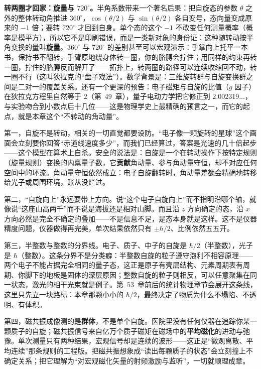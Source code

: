 \begin{challenge}
\textbf{转两圈才回家：旋量与 $720^\circ$。}半角系数带来一个著名后果：把自旋态的参数 $\theta$ 之外的整体转动角推进 $360^\circ$，$\cos(\theta/2)$ 与 $\sin(\theta/2)$ 各自变号，态向量变成原来的 $-1$ 倍；要转 $720^\circ$ 才回到自身。单个态的这个 $-1$ 不改变任何测量概率（概率是模平方），所以它不是印刷错误，而是一类新对象的身份证：这种随转动按半角变换的量叫\textbf{旋量}。$360^\circ$ 与 $720^\circ$ 的差别甚至可以宏观演示：手掌向上托平一本书，保持书不翻转，手臂原地绕身体转一圈，你的胳膊会拧住；用同样的约束再转一圈，拧住的胳膊反而解开了——拓扑上，转两圈的路径可以连续收缩回不动，转一圈不行（这叫狄拉克的“盘子戏法”）。数学背景是：三维旋转群与自旋变换群之间是二对一的覆盖关系。还有一个更深的预告：电子磁矩与自旋的比值（$g$ 因子）在狄拉克方程里自然等于 $2$（第~49~章），量子电动力学把它修正到 $2.002319\ldots$，与实验吻合到小数点后十几位——这是物理学史上最精确的预言之一，而它的起点，就是本章这个“不转动的角动量”。
\end{challenge}


第一，自旋不是转动，相关的一切直觉都要设防。“电子像一颗旋转的星球”这个画面会立刻要你回答“赤道线速度多少”，而我们已经算过，答案是光速的几十倍起步——这个模型在算术上自杀。安全的说法是：自旋是一个在转动操作下按特定规则（旋量规则）变换的内禀量子数，它\textbf{贡献}角动量、参与角动量守恒，却不对应任何空间中的环流。角动量守恒依然成立：电子自旋翻转时，角动量差额会精确地转移给光子或周围环境，账从没烂过。

第二，“自旋向上”永远要带上方向。说“这个电子自旋向上”而不指明沿哪个轴，就像说“这座山高两千”而不说是海拔还是相对山脚。而且沿 $z$ 方向确定的态，沿 $x$ 方向必然是完全不确定的叠加——不是信息不足，是态本身就是这样。这不是仪器精度问题，仪器做得再完美，单次结果依然只有 $\pm\hbar/2$、比例依然五五开。

第三，半整数与整数的分界线。电子、质子、中子的自旋是 $\hbar/2$（半整数），光子是 $\hbar$（整数）。这条分界不是分类癖：半整数自旋的粒子遵守泡利不相容原理——两个电子不能占据完全相同的量子态，这正是原子有壳层结构、元素周期表有周期、你脚下的地板是固体的深层原因；整数自旋的粒子则相反，可以任意聚集在同一状态，激光的相干光束就是例子。第~53~章前后的统计物理章节会展开这条线，这里只先立一块路标：本章那颗小小的 $\hbar/2$，最终决定了物质为什么不塌陷、不透明、有体积。

第四，磁共振成像测的是\textbf{群体}，不是单个自旋。医院里没有任何仪器在追踪你某一颗质子的自旋；磁共振信号来自亿万个质子磁矩在磁场中的\textbf{平均磁化}的进动与弛豫。单次测量只有两种结果，宏观信号却是连续的波形——这正是“微观离散、平均连续”那条规则的工程版。把磁共振想象成“读出每颗质子的状态”会立刻撞上不确定关系；把它理解为“对宏观磁化矢量的射频激励与监听”，一切就顺理成章。

